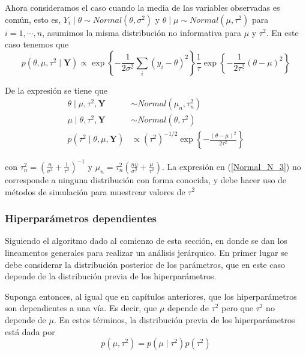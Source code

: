 \documentclass[10pt,openright]{book}\usepackage[]{graphicx}\usepackage[]{color}
\begin{document}
Ahora consideramos el caso cuando la media de las variables observadas es com\'un, esto es, $Y_i\mid\theta\sim Normal(\theta,\sigma^2)$ y $\theta\mid\mu\sim Normal(\mu,\tau^2)$ para $i=1,\cdots,n$, asumimos la misma distribuci\'on no informativa para $\mu$ y $\tau^2$. En este caso tenemos que
\begin{equation*}
p(\theta,\mu,\tau^2\mid\mathbf{Y})\propto\exp\left\{-\frac{1}{2\sigma^2}\sum_i(y_i-\theta)^2\right\}
\frac{1}{\tau}\exp\left\{-\frac{1}{2\tau^2}(\theta-\mu)^2\right\}
\end{equation*}

De la expresi\'on se tiene que 
\begin{align}
\theta\mid\mu,\tau^2,\mathbf{Y}&\sim Normal(\mu_n,\tau^2_n)\label{Normal_N_1}\\
\mu\mid\theta,\tau^2,\mathbf{Y}&\sim Normal(\theta,\tau^2)\label{Normal_N_2}\\
p(\tau^2\mid\theta,\mu,\mathbf{Y})&\propto (\tau^2)^{-1/2}\exp\left\{-\frac{(\theta-\mu)^2}{2\tau^2}\right\}\label{Normal_N_3}
\end{align}

con $\tau^2_n=(\frac{n}{\sigma^2}+\frac{1}{\tau^2})^{-1}$ y $\mu_n=\tau^2_n(\frac{n\bar{y}}{\sigma^2}+\frac{\mu}{\tau^2})$. La expresi\'on en (\ref{Normal_N_3}) no corresponde a ninguna distribuci\'on con forma conocida, y debe hacer uso de m\'etodos de simulaci\'on para muestrear valores de $\tau^2$


\subsubsection{Hiperpar\'ametros dependientes}
Siguiendo el algoritmo dado al comienzo de esta secci\'on, en donde se dan los lineamentos generales para realizar un an\'alisis jer\'arquico. En primer lugar se debe considerar la distribuci\'on posterior de los par\'ametros, que en este caso depende de la distribuci\'on previa de los hiperpar\'ametros.

Suponga entonces, al igual que en cap\'itulos anteriores, que los hiperpar\'ametros son dependientes a una v\'ia. Es decir, que $\mu$ depende de $\tau^2$ pero que $\tau^2$ no depende de $\mu$. En estos t\'erminos, la distribuci\'on previa de los hiperpar\'ametros est\'a dada por
\begin{equation*}
p(\mu,\tau^2)=p(\mu \mid \tau^2)p(\tau^2)
\end{equation*}
\end{document}
